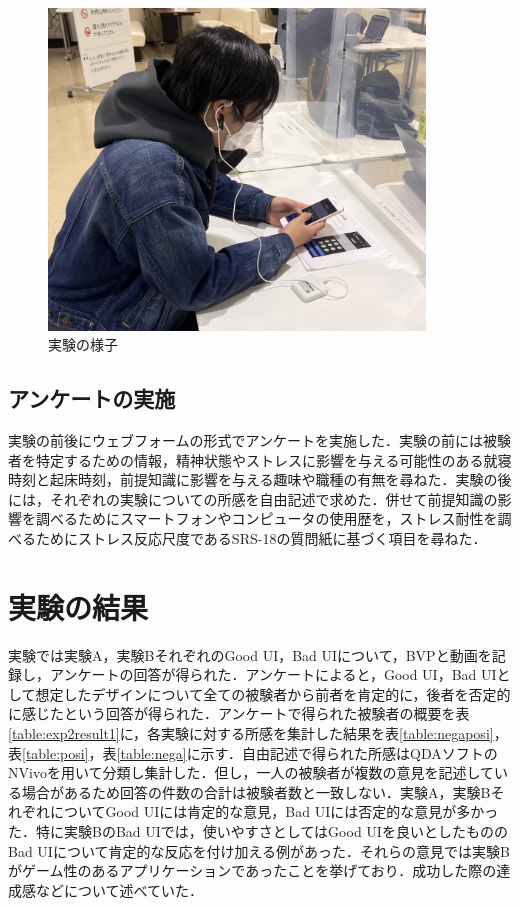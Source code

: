 \begin{figure}[htbp]
  \begin{minipage}{\hsize}
    \begin{center}
       \includegraphics[width=100mm]{img/experience.jpg}
    \end{center}
    \caption{実験の様子}
    \label{fig:observe}
  \end{minipage}
\end{figure}

\subsection{アンケートの実施}

実験の前後にウェブフォームの形式でアンケートを実施した．実験の前には被験者を特定するための情報，精神状態やストレスに影響を与える可能性のある就寝時刻と起床時刻，前提知識に影響を与える趣味や職種の有無を尋ねた．実験の後には，それぞれの実験についての所感を自由記述で求めた．併せて前提知識の影響を調べるためにスマートフォンやコンピュータの使用歴を，ストレス耐性を調べるためにストレス反応尺度であるSRS-18\cite{stressquestionare}の質問紙に基づく項目を尋ねた．

\section{実験の結果}

実験では実験A，実験BそれぞれのGood UI，Bad UIについて，BVPと動画を記録し，アンケートの回答が得られた．アンケートによると，Good UI，Bad UIとして想定したデザインについて全ての被験者から前者を肯定的に，後者を否定的に感じたという回答が得られた．アンケートで得られた被験者の概要を表\ref{table:exp2result1}に，各実験に対する所感を集計した結果を表\ref{table:negaposi}，表\ref{table:posi}，表\ref{table:nega}に示す．自由記述で得られた所感はQDAソフトのNVivoを用いて分類し集計した．但し，一人の被験者が複数の意見を記述している場合があるため回答の件数の合計は被験者数と一致しない．実験A，実験BそれぞれについてGood UIには肯定的な意見，Bad UIには否定的な意見が多かった．特に実験BのBad UIでは，使いやすさとしてはGood UIを良いとしたもののBad UIについて肯定的な反応を付け加える例があった．それらの意見では実験Bがゲーム性のあるアプリケーションであったことを挙げており．成功した際の達成感などについて述べていた．

